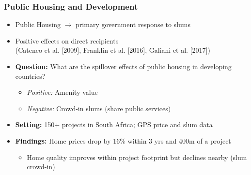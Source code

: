 \documentclass[aspectratio=149]{beamer}
\begin{document}
\begin{frame}
\frametitle{Public Housing and Development}


\begin{itemize}
  \item Public Housing $\rightarrow$ primary government response to slums
  \vspace{.1cm}
  \item Positive effects on direct recipients \\ 
  {\footnotesize (Cateneo et al. [2009], Franklin et al. [2016], Galiani et al. [2017])}
  \vspace{.1cm}
  \item \textbf{Question:}  What are the spillover effects of public housing in developing countries?
      \begin{itemize}
      \item \textit{Positive:} Amenity value
      \item \textit{Negative:} Crowd-in slums (share public services)
    \end{itemize}
  \vspace{.1cm}
  \item \textbf{Setting:} 150+ projects in South Africa; GPS price and slum data
  \vspace{.1cm}
  \item \textbf{Findings:} Home prices drop by 16\% within 3 yrs and 400m of a project
    \begin{itemize}
      \item Home quality improves within project footprint but declines nearby (slum crowd-in)
    \end{itemize}
\end{itemize}
\end{frame}


\end{document}
